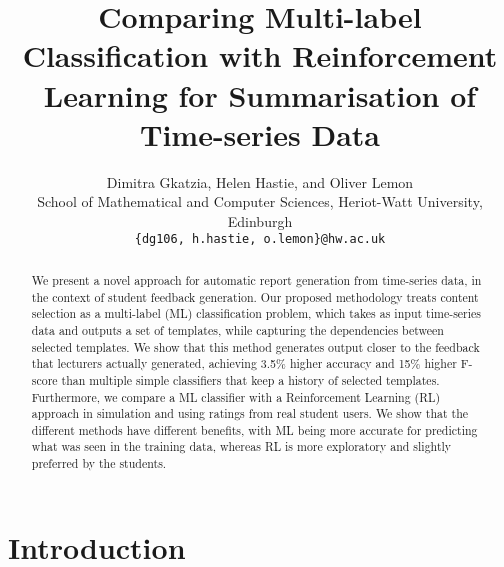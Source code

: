 \documentclass[11pt]{article}
\title{Comparing Multi-label Classification with Reinforcement Learning for Summarisation of Time-series Data}
\author{Dimitra Gkatzia, Helen Hastie, and Oliver Lemon \\
  School of Mathematical and Computer Sciences, Heriot-Watt University, Edinburgh \\
  {\tt \{dg106, h.hastie, o.lemon\}@hw.ac.uk}}
\date{}
\begin{document}
\maketitle
\begin{abstract} 
We present a novel approach for automatic 
report generation from time-series data, in the context of student feedback generation. 
Our proposed methodology treats content selection as a multi-label (ML) classification problem, 
which takes as input time-series data and outputs a set of templates, while capturing the 
dependencies between selected templates.
We show that this method generates output closer
to the feedback that lecturers actually generated, achieving 3.5\% higher accuracy and 
15\% higher F-score than 
multiple simple classifiers that keep a history of selected templates. 
Furthermore, we  compare a ML classifier with a 
Reinforcement Learning (RL) approach in simulation and using ratings from real student users. 
We show that the different methods have different benefits, with ML being more
accurate for predicting what was seen in the
training data, whereas RL is more exploratory and slightly preferred by the students.

\end{abstract}

\section{Introduction} \label{intro}
\end{document}
